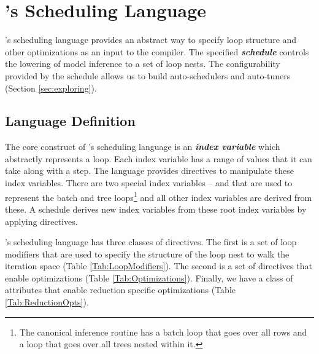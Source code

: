 \section{\Treebeard{}'s Scheduling Language}
\label{sec:schedule}
\Treebeard{}'s scheduling language provides an abstract way to specify loop structure and 
other optimizations as an input to the compiler. The specified 
\textbf{\emph{schedule}} controls the lowering of model inference to a set of 
loop nests. The configurability provided by the schedule allows us 
to build auto-schedulers and auto-tuners (Section \ref{sec:exploring}).


\subsection{Language Definition}
The core construct of \Treebeard{}'s scheduling language is an 
\textbf{\emph{index variable}} which abstractly represents a loop. 
Each index variable has a range of values that it can take along 
with a step. 
The language provides directives to manipulate these index 
variables. There are two special index variables --  and
 that are used to represent the batch and tree loops\footnote{
The canonical inference routine has a batch loop that goes over 
all rows and a loop that goes over all trees nested within it.} and all 
other index variables are derived from these. A schedule derives 
new index variables from these root index variables by applying
directives.

\Treebeard{}'s scheduling language has three classes of directives. The first is a set 
of loop modifiers that are used to specify the structure of the loop nest to
walk the iteration space (Table \ref{Tab:LoopModifiers}). The second is a set of 
directives that enable optimizations (Table \ref{Tab:Optimizations}). 
Finally, we have a class of attributes that enable reduction specific optimizations
(Table \ref{Tab:ReductionOpts}).

